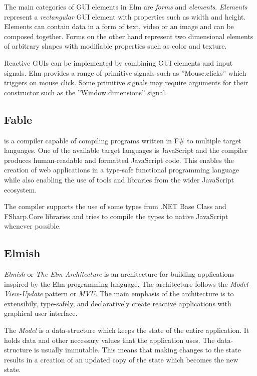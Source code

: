 The main categories of GUI elements in Elm are \emph{forms} and \emph{elements}.
\emph{Elements} represent a \emph{rectangular} GUI element with properties such as width and height. Elements
can contain data in a form of text, video or an image and can be composed together.
Forms on the other hand represent two dimensional elements of arbitrary shapes with
modifiable properties such as color and texture.

Reactive GUIs can be implemented by combining GUI elements and input signals.
Elm provides a range of primitive signals such as ”Mouse.clicks” which triggers on
mouse click. Some primitive signals may require arguments for their constructor such
as the ”Window.dimensions” signal.

\subsection{Fable}

\citet{fable} is a compiler capable of compiling programs written in F\# to multiple
target languages. One of the available target languages is JavaScript and the compiler
produces human-readable and formatted JavaScript code. This enables the creation of
web applications in a type-safe functional programming language while also enabling
the use of tools and libraries from the wider JavaScript ecosystem.

The compiler supports the use of some types from .NET Base Class and FSharp.Core
libraries \cite{fable-comp} and tries to compile the types to native JavaScript whenever possible.

\subsection{Elmish}
\label{sec:elmish}

\emph{Elmish} or \emph{The Elm Architecture}\cite{eml-arch} is an architecture for building applications inspired
by the Elm programming language. The architecture follows the \emph{Model-View-Update}
pattern or \emph{MVU}. The main emphasis of the architecture is to extensibily, type-safely,
and declaratively create reactive applications with graphical user interface.


The \emph{Model} is a data-structure which keeps the state of the entire application. It
holds data and other necessary values that the application uses.
The data-structure is usually immutable.
This means that making changes to the state results in a creation
of an updated copy of the state which becomes the new state.


